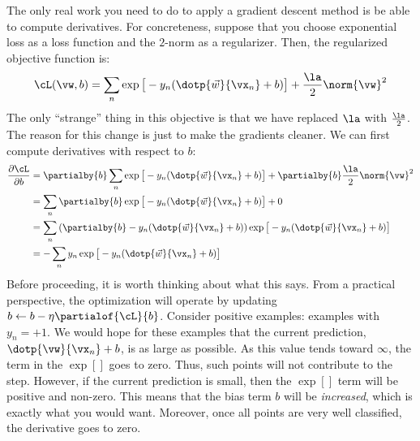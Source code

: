The only real work you need to do to apply a gradient descent method
is be able to compute derivatives.  For concreteness, suppose that you
choose exponential loss as a loss function and the $2$-norm as a
regularizer.  Then, the regularized objective function is:
%
\begin{equation}
\cL(\vw,b) =
\sum_n 
  \exp\big[-y_n (\dotp{\vec w}{\vx_n}+b)\big] +
 \frac \la 2 \norm{\vw}^2
\end{equation}
%
The only ``strange'' thing in this objective is that we have replaced
$\la$ with $\frac \la 2$.  The reason for this change is just to make
the gradients cleaner.  We can first compute derivatives with respect
to $b$:
%
\begin{align}
\frac {\partial\cL} {\partial b}
&= \partialby{b}\sum_n \exp\big[-y_n (\dotp{\vec w}{\vx_n}+b)\big] + \partialby{b}\frac \la 2 \norm{\vw}^2\\
&= \sum_n \partialby{b} \exp\big[ -y_n (\dotp{\vec w}{\vx_n}+b)\big] + 0\\
&= \sum_n \left( \partialby{b} -y_n (\dotp{\vec w}{\vx_n}+b) \right) \exp\big[ -y_n (\dotp{\vec w}{\vx_n}+b)\big]\\
&= - \sum_n y_n \exp\big[ -y_n (\dotp{\vec w}{\vx_n}+b)\big]
\end{align}
%
Before proceeding, it is worth thinking about what this says.  From a
practical perspective, the optimization will operate by updating $b
\leftarrow b - \eta \partialof{\cL}{b}$.  Consider positive examples:
examples with $y_n=+1$.  We would hope for these examples that the
current prediction, $\dotp{\vw}{\vx_n}+b$, is as large as possible.
As this value tends toward $\infty$, the term in the $\exp[]$ goes to
zero.  Thus, such points will not contribute to the step.  However, if
the current prediction is small, then the $\exp[]$ term will be
positive and non-zero.  This means that the bias term $b$ will be
\emph{increased}, which is exactly what you would want.  Moreover,
once all points are very well classified, the derivative goes to zero.


